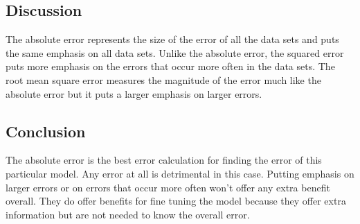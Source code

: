 \documentclass[onecolumn, draftclsnofoot,10pt, compsoc]{IEEEtran}
\begin{document}
		\subsection{Discussion}
		
		The absolute error represents the size of the error of all the data sets and puts the same emphasis on all data sets. Unlike the absolute error, the squared error puts more emphasis on the errors that occur more often in the data sets. The root mean square error measures the magnitude of the error much like the absolute error but it puts a larger emphasis on larger errors.

		\subsection{Conclusion}		

        The absolute error is the best error calculation for finding the error of this particular model. Any error at all is detrimental in this case. Putting emphasis on larger errors or on errors that occur more often won't offer any extra benefit overall. They do offer benefits for fine tuning the model because they offer extra information but are not needed to know the overall error.
	
	
    

	
\end{document}
